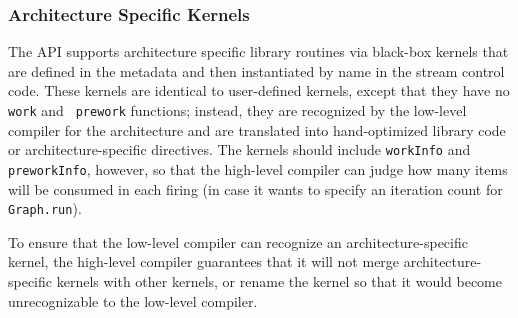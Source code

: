 \subsubsection{Architecture Specific Kernels}
\label{sec:library}

The API supports architecture specific library routines via black-box
kernels that are defined in the metadata and then instantiated by name
in the stream control code.  These kernels are identical to
user-defined kernels, except that they have no {\tt work} and {\tt
prework} functions; instead, they are recognized by the low-level
compiler for the architecture and are translated into hand-optimized
library code or architecture-specific directives.  The kernels should
include {\tt workInfo} and {\tt preworkInfo}, however, so that the
high-level compiler can judge how many items will be consumed in each
firing (in case it wants to specify an iteration count for {\tt
Graph.run}).

To ensure that the low-level compiler can recognize an
architecture-specific kernel, the high-level compiler guarantees that
it will not merge architecture-specific kernels with other kernels, or
rename the kernel so that it would become unrecognizable to the
low-level compiler.
